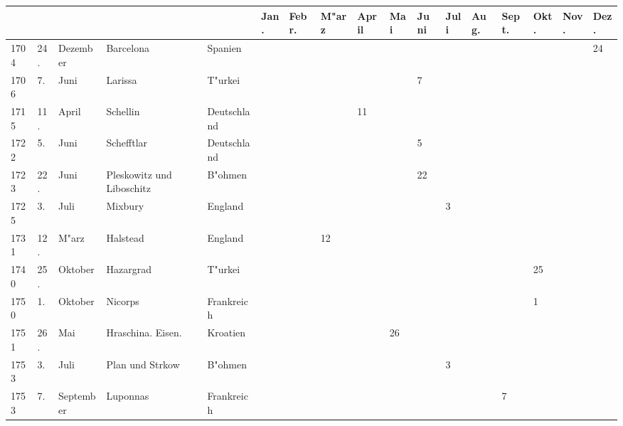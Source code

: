 \documentclass[a4paper, 8pt, oneside, polutonikogreek, german]{article}
\begin{document}
\section{}
\vspace*{\fill}
\clearpage
\begin{landscape}
\begin{table}[H]
    \footnotesize
    \frakfamily
    \centering
    \begin{longtable}{|p{5mm}|p{4mm}|p{13mm}|p{17mm}|p{17mm}|p{4mm}|p{6mm}|p{6mm}|p{6mm}|p{4mm}|p{5mm}|p{4mm}|p{5mm}|p{6mm}|p{5mm}|p{5mm}|p{5mm}|}
    \hline
         &  &  &  &  & Jan. & Febr. & M"arz & April & Mai & Juni & Juli & Aug. & Sept. & Okt. & Nov. & Dez. \\ \hline
        1704 & 24. & Dezember & Barcelona & Spanien & ~ & ~ & ~ & ~ & ~ & ~ & ~ & ~ & ~ & ~ & ~ & 24 \\ \hline
        1706 & 7. & Juni & Larissa & T"urkei & ~ & ~ & ~ & ~ & ~ & 7 & ~ & ~ & ~ & ~ & ~ & ~ \\ \hline
        1715 & 11. & April & Schellin & Deutschland & ~ & ~ & ~ & 11 & ~ & ~ & ~ & ~ & ~ & ~ & ~ & ~ \\ \hline
        1722 & 5. & Juni & Schefftlar & Deutschland & ~ & ~ & ~ & ~ & ~ & 5 & ~ & ~ & ~ & ~ & ~ & ~ \\ \hline
        1723 & 22. & Juni & Pleskowitz und Liboschitz & B"ohmen & ~ & ~ & ~ & ~ & ~ & 22 & ~ & ~ & ~ & ~ & ~ & ~ \\ \hline
        1725 & 3. & Juli & Mixbury & England & ~ & ~ & ~ & ~ & ~ & ~ & 3 & ~ & ~ & ~ & ~ & ~ \\ \hline
        1731 & 12. & M"arz & Halstead & England & ~ & ~ & 12 & ~ & ~ & ~ & ~ & ~ & ~ & ~ & ~ & ~ \\ \hline
        1740 & 25. & Oktober & Hazargrad & T"urkei & ~ & ~ & ~ & ~ & ~ & ~ & ~ & ~ & ~ & 25 & ~ & ~ \\ \hline
        1750 & 1. & Oktober & Nicorps & Frankreich & ~ & ~ & ~ & ~ & ~ & ~ & ~ & ~ & ~ & 1 & ~ & ~ \\ \hline
        1751 & 26. & Mai & Hraschina. Eisen. & Kroatien & ~ & ~ & ~ & ~ & 26 & ~ & ~ & ~ & ~ & ~ & ~ & ~ \\ \hline
        1753 & 3. & Juli & Plan und Strkow & B"ohmen & ~ & ~ & ~ & ~ & ~ & ~ & 3 & ~ & ~ & ~ & ~ & ~ \\ \hline
        1753 & 7. & September & Luponnas & Frankreich & ~ & ~ & ~ & ~ & ~ & ~ & ~ & ~ & 7 & ~ & ~ & ~ \\ \hline

\end{longtable}
\end{table}
\end{landscape}
\end{document}
